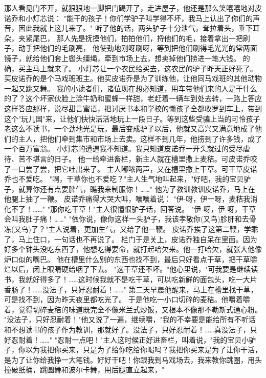 \documentclass[12pt,UTF8]{ctexbook}
\begin{document}
那人看见门不开，就狠狠地一脚把门踢开了，走进屋子，他还是那么笑嘻嘻地对皮诺乔和小灯芯说：
"能干的孩子！你们学驴子叫学得不坏，我马上认出了你们的声音，因此我就上这儿来了。"
听了他的话，两头驴子十分泄气，耷拉着头，垂下耳朵，夹紧尾巴，
那人先是抚摸他们，拍拍他们，捋他们的毛，接着拿出一把刷子，动手把他们的毛刷亮，
他使劲地刚呀刷呀，等到把他们刷得毛光光的常两面镜子，就给他们套上辔头缰绳，牵到市场上去，想卖掉他们捞进一笔大钱。
的确，买主马上就来了。
小灯芯让一个农民给买去，这农民的驴子昨天正好死了。买皮诺乔的是个马戏班班主。他买皮诺乔是为了训练他，让他同马戏班的其他动物一起又跳又舞。
我的小读者们，诸位现在想必知道，用车带他们来的人是干什么的了？这个坏家伙脸上涂牛奶和蜜蜂一样甜，老赶着一辆车到处去转，一路上答应这样答应那样，说尽甜言蜜语，把讨厌书本和学校的懒孩子全都收罗到车上，带到这个"玩儿国"来，让他们快快活活地玩上一段日子。等到这些受骗上当的可怜孩子老这么不读书，一个劲地光是玩，最后变成驴子以后，他就又高兴又满意地成了他们的主人，把他们牵到集市和市场上去卖。这样不到几年，他捞到了许多钱，成了一个百万富翁。
小灯芯的遭遇我不知道。我只知道皮诺乔一开头就过的受尽虐待、苦不堪言的日子。
他一给牵进畜栏，新主人就在槽里撒上麦秸。可皮诺乔咬了一口尝了尝，把它吐出来了。
主人嘟哝两声，又在槽里撒上干草。可干草皮诺乔也不爱吃。
"啊，干草你也不爱吃？"主人生气地叫起来，"好吧，我的宝贝驴子，就算你还有点耍脾气，瞧我来制服你！……"
他为了教训教训皮诺乔，马上在他腿上抽了一鞭。
皮诺乔痛得大哭大叫，嚷嚷着说：
"伊-呀，伊一呀，麦秸我消化不了！……"
"那你吃干草！"主人很懂很驴子话，回答说。
"伊-呀，伊-呀，干草会叫我肚子痛！……"
"依你说，像你这样一头驴子，我该孝敬你(又鸟)胗肝和去骨冻(又鸟)了？"主人说着，更加生气，又给了他一鞭。
皮诺乔挨了这第二鞭，学乖了，马上住口，一句话也不再说了。
栏门于是关上，皮诺乔独自呆在里面。因为好多个钟头没吃东西了，他想吃得要命，就打起哈欠来。他一打哈欠，就张大他像炉口似的嘴巴。
他在槽里什么别的东西也找不到，最后只好看点干草，把干草嚼烂以后，闭上眼睛硬给咽了下去。
"这干草还不坏。"他心里说，"可我要是继续读书，我就好得多了！……这时候我就不是吃干草，可以吃新鲜的面包头，吃一大片香肠了！……没法子，只好忍耐着！……"
第二天早晨他醒来，马上在槽里找干草，可是找不到，因为昨天夜里都吃光了。
于是他吃一小口切碎的麦秸。他嚼着嚼着，觉得切碎麦秸的味道既完全不像米兰式炒饭，又根本不像那不勒斯式通心粉。
"没法子，只好忍耐着！"他又说了一遍，继续嚼，"我的不幸要是能给所有不听话和不想读书的孩子作为教训，那就好了。没法子，只好忍耐着！……真没法子，只好忍耐着！……"
"忍耐一点吧！"主人这时候正好进畜栏，叫着说，"我的宝贝小驴子，你以为我把你买来，只是为了给你吃给你喝吗？我把你买来是为了让你干活，是为了让你给我挣一大笔钱。好好干吧！你跟我到马戏场去，我来教你跳圈，用头撞破纸桶，跳圆舞和波尔卡舞，用后腿直立起来，"
\end{document}
